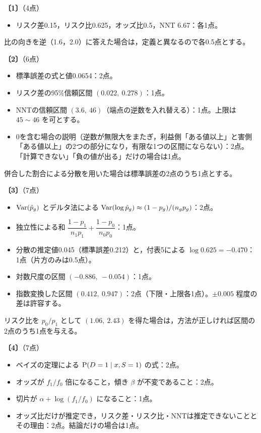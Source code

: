 \documentclass[a4paper,11pt]{ltjsarticle}
\renewcommand{\ans}[1]{\par\medskip\noindent\textbf{〔#1〕}\quad}
\renewcommand{\points}[1]{\hfill\textnormal{（#1点）}\par\nobreak}
\begin{document}
\ans{1}\points{4}
\begin{itemize}
\item リスク差0.15，リスク比0.625，オッズ比0.5，NNT 6.67：各1点。
\end{itemize}
比の向きを逆（1.6，2.0）に答えた場合は，定義と異なるので各0.5点とする。

\ans{2}\points{6}
\begin{itemize}
\item 標準誤差の式と値0.0654：2点。
\item リスク差の95\%信頼区間 $(0.022,\ 0.278)$：1点。
\item NNTの信頼区間 $(3.6,\ 46)$（端点の逆数を入れ替える）：1点。上限は $45\sim46$ を可とする。
\item 0を含む場合の説明（逆数が無限大をまたぎ，利益側「ある値以上」と害側「ある値以上」の2つの部分になり，有限な1つの区間にならない）：2点。
「計算できない」「負の値が出る」だけの場合は1点。
\end{itemize}
併合した割合による分散を用いた場合は標準誤差の2点のうち1点とする。

\ans{3}\points{7}
\begin{itemize}
\item $\operatorname{Var}(\hat p_g)$ とデルタ法による $\operatorname{Var}(\log\hat p_g)\approx(1-p_g)/(n_gp_g)$：2点。
\item 独立性による和 $\dfrac{1-p_1}{n_1p_1}+\dfrac{1-p_0}{n_0p_0}$：1点。
\item 分散の推定値0.045（標準誤差0.212）と，付表5による $\log0.625=-0.470$：1点（片方のみは0.5点）。
\item 対数尺度の区間 $(-0.886,\ -0.054)$：1点。
\item 指数変換した区間 $(0.412,\ 0.947)$：2点（下限・上限各1点）。$\pm0.005$ 程度の差は許容する。
\end{itemize}
リスク比を $p_0/p_1$ として $(1.06,\ 2.43)$ を得た場合は，方法が正しければ区間の2点のうち1点を与える。

\ans{4}\points{7}
\begin{itemize}
\item ベイズの定理による $\operatorname{P}(D=1\mid x,S=1)$ の式：2点。
\item オッズが $f_1/f_0$ 倍になること，傾き $\beta$ が不変であること：2点。
\item 切片が $\alpha+\log(f_1/f_0)$ になること：1点。
\item オッズ比だけが推定でき，リスク差・リスク比・NNTは推定できないこととその理由：2点。結論だけの場合は1点。
\end{itemize}
\end{document}
